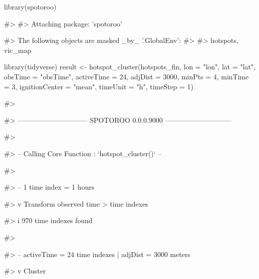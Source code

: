 \begin{Schunk}
\begin{Sinput}
library(spotoroo)
\end{Sinput}
\begin{Soutput}
#> 
#> Attaching package: 'spotoroo'
\end{Soutput}
\begin{Soutput}
#> The following objects are masked _by_ '.GlobalEnv':
#> 
#>     hotspots, vic_map
\end{Soutput}
\begin{Sinput}
library(tidyverse)
result <- hotspot_cluster(hotspots_fin,
                          lon = "lon",
                          lat = "lat",
                          obsTime = "obsTime",
                          activeTime = 24,
                          adjDist = 3000,
                          minPts = 4,
                          minTime = 3,
                          ignitionCenter = "mean",
                          timeUnit = "h",
                          timeStep = 1)
\end{Sinput}
\begin{Soutput}
#> 
\end{Soutput}
\begin{Soutput}
#> ------------------------------ SPOTOROO 0.0.0.9000 -----------------------------
\end{Soutput}
\begin{Soutput}
#> 
\end{Soutput}
\begin{Soutput}
#> -- Calling Core Function : `hotspot_cluster()` --
\end{Soutput}
\begin{Soutput}
#> 
\end{Soutput}
\begin{Soutput}
#> -- 1 time index = 1 hours
\end{Soutput}
\begin{Soutput}
#> v Transform observed time > time indexes
\end{Soutput}
\begin{Soutput}
#> i 970 time indexes found
\end{Soutput}
\begin{Soutput}
#> 
\end{Soutput}
\begin{Soutput}
#> -- activeTime = 24 time indexes | adjDist = 3000 meters
\end{Soutput}
\begin{Soutput}
#> v Cluster
\end{Soutput}

\end{Schunk}
